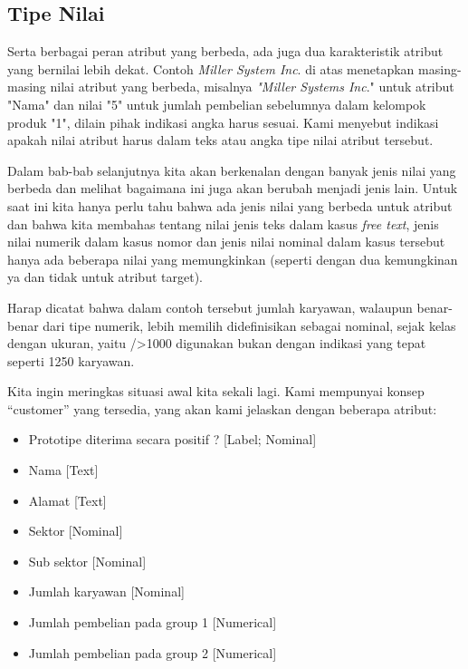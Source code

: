 \subsection{Tipe Nilai}
\par Serta berbagai peran atribut yang berbeda, ada juga dua karakteristik atribut yang bernilai lebih dekat. Contoh \textit{Miller System Inc}. di atas menetapkan masing-masing nilai atribut yang berbeda, misalnya \textit{"Miller Systems Inc}." untuk atribut "Nama" dan nilai "5" untuk jumlah pembelian sebelumnya dalam kelompok produk "1", dilain pihak indikasi angka harus sesuai. Kami menyebut indikasi apakah nilai atribut harus dalam teks atau angka tipe nilai atribut tersebut.

\par Dalam bab-bab selanjutnya kita akan berkenalan dengan banyak jenis nilai yang berbeda dan melihat bagaimana ini juga akan berubah menjadi jenis lain. Untuk saat ini kita hanya perlu tahu bahwa ada jenis nilai yang berbeda untuk atribut dan bahwa kita membahas tentang nilai jenis teks dalam kasus \textit{free text}, jenis nilai numerik dalam kasus nomor dan jenis nilai nominal dalam kasus tersebut hanya ada beberapa nilai yang memungkinkan (seperti dengan dua kemungkinan ya dan tidak untuk atribut target).

\par Harap dicatat bahwa dalam contoh tersebut jumlah karyawan, walaupun benar-benar dari tipe numerik, lebih memilih didefinisikan sebagai nominal, sejak kelas dengan ukuran, yaitu />1000 digunakan bukan dengan indikasi yang tepat seperti 1250 karyawan.

\par Kita ingin meringkas situasi awal kita sekali lagi. Kami mempunyai konsep “customer” yang tersedia, yang akan kami jelaskan dengan beberapa atribut:

\begin{itemize}
    \item 	Prototipe diterima secara positif ? [Label; Nominal]
\item 	Nama [Text]
\item 	Alamat [Text]
\item 	Sektor [Nominal]
\item 	Sub sektor [Nominal]
\item 	Jumlah karyawan [Nominal]
\item 	Jumlah pembelian pada group 1 [Numerical]
\item 	Jumlah pembelian pada group 2 [Numerical] 

\end{itemize}

